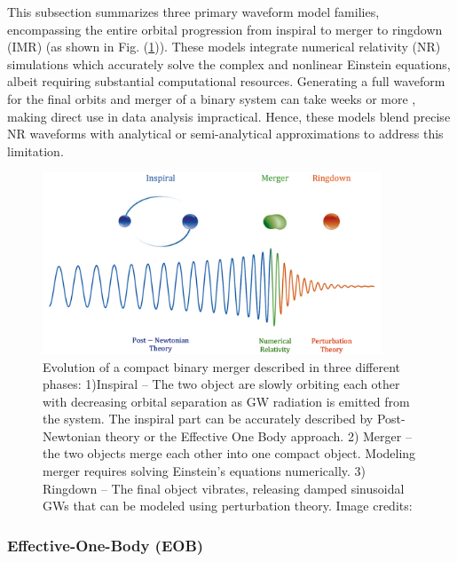 This subsection summarizes three primary waveform model families, encompassing the entire orbital progression from inspiral to merger to ringdown (IMR) (as shown in Fig. (\ref{fig:full-IMR-wf})). These models integrate numerical relativity (NR) simulations which accurately solve the complex and nonlinear Einstein equations, albeit requiring substantial computational resources. Generating a full waveform for the final orbits and merger of a binary system can take weeks or more \cite{Hannam:2009rd}, making direct use in data analysis impractical. Hence, these models blend precise NR waveforms with analytical or semi-analytical approximations to address this limitation.

\begin{figure}
    \centering
    \includegraphics[width=0.9\textwidth]{figures/Introduction/Full-IMR.png}
    \caption{Evolution of a compact binary merger described in three different phases: 1)Inspiral -- The two object are slowly orbiting each other with decreasing orbital separation as GW radiation is emitted from the system. The inspiral part can be accurately described by Post-Newtonian theory or the Effective One Body approach. 2) Merger -- the two objects merge each other into one compact object. Modeling merger requires solving Einstein's equations numerically. 3) Ringdown -- The final object vibrates, releasing damped sinusoidal GWs that can be modeled using perturbation theory. Image credits: \cite{Antelis:2016icm}}
    \label{fig:full-IMR-wf}
\end{figure}



\subsubsection{Effective-One-Body (EOB)}

